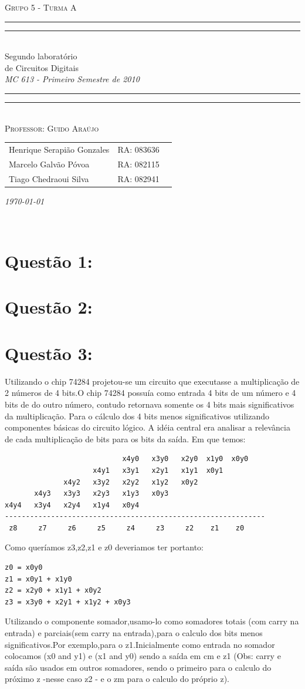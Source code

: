 \documentclass[10pt, letterpaper]{article}
\numberwithin{table}{section}
\numberwithin{figure}{section}
\newcommand*{\titleTMB}{\begingroup
\centering
\settowidth{\unitlength}{\LARGE MC 613}
\vspace*{\baselineskip}
{\large\scshape  Grupo 5 - Turma A}\\[\baselineskip]
\rule{11.0cm}{1.6pt}\vspace*{-\baselineskip}\vspace*{2pt}
\rule{11.0cm}{0.4pt}\\[\baselineskip]
{\LARGE Segundo laboratório }\\[0.2\baselineskip]
{\LARGE de Circuitos Digitais}\\[0.2\baselineskip]
{\itshape MC 613 - Primeiro Semestre de 2010}\\[0.2\baselineskip]
\rule{11.0cm}{0.4pt}\vspace*{-\baselineskip}\vspace{3.2pt}
\rule{11.0cm}{1.6pt}\\[\baselineskip]
{\large\scshape Professor: Guido Araújo}\par
\vfill
{\normalsize   \scshape 

\begin{center}
	\begin{tabular}{  l  l  p{5cm} }
		Henrique Serapião Gonzales     &  RA: 083636 \\
		Marcelo Galvão Póvoa & RA: 082115\\
		Tiago Chedraoui Silva      & RA: 082941\\ 
		
	\end{tabular}
\end{center}

\itshape \today }\\[\baselineskip]
\vspace{3.2pt}
\endgroup}
\begin{document}
\begin{titlepage} 
\titleTMB
\end{titlepage} 
\newpage

\newpage
\section{Quest\~ao 1:}


\newpage
\section{Quest\~ao 2:}



\newpage
\section{Quest\~ao 3:}

Utilizando o chip 74284 projetou-se um circuito que executasse a multiplicação de 2 números de 4 bits.O chip 74284 possuía como entrada 4 bits de um número e 4 bits de do outro número, contudo retornava somente os 4 bits mais significativos da multiplicação. Para o cálculo dos 4 bits menos significativos utilizando componentes básicas do circuito lógico.
A idéia central era analisar a relevância de cada multiplicação de bits para os bits da saída.
Em que temos:
\begin{verbatim}
                            x4y0   x3y0   x2y0  x1y0  x0y0
                     x4y1   x3y1   x2y1   x1y1  x0y1
              x4y2   x3y2   x2y2   x1y2   x0y2
       x4y3   x3y3   x2y3   x1y3   x0y3
x4y4   x3y4   x2y4   x1y4   x0y4
--------------------------------------------------------------
 z8     z7     z6     z5     z4     z3     z2    z1    z0
\end{verbatim}
Como queríamos z3,z2,z1 e z0 deveriamos ter portanto:
\begin{verbatim}
z0 = x0y0
z1 = x0y1 + x1y0
z2 = x2y0 + x1y1 + x0y2
z3 = x3y0 + x2y1 + x1y2 + x0y3
\end{verbatim}
Utilizando o componente somador,usamo-lo como somadores totais (com carry na entrada) e parciais(sem carry na entrada),para o calculo dos bits menos significativos.Por exemplo,para o z1.Inicialmente como entrada no somador colocamos (x0 and y1) e (x1 and y0) sendo a sa\'ida em cm e z1 (Obs: carry e sa\'ida são usados em outros somadores, sendo o primeiro para o calculo do próximo z -nesse caso z2 - e o zm para o calculo do próprio z).
\end{document}
